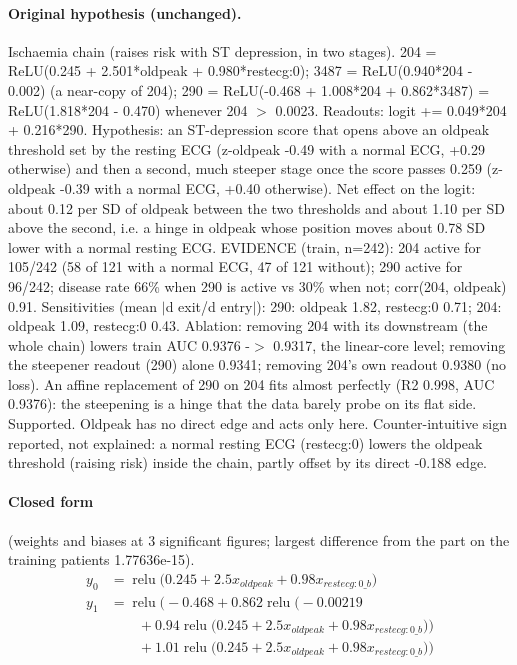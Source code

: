 \documentclass[a4paper,10pt]{article}
\newif\ifreviewmarks
\newcommand{\reviewrule}{\noindent{\color{BrickRed}\rule{\linewidth}{0.8pt}}}
\newenvironment{drafted}[1][]{%
  \ifreviewmarks\par\addvspace{\medskipamount}\reviewrule\par\nopagebreak
  \noindent{\color{BrickRed}\sffamily\footnotesize\textbf{Thesis Draft}\quad #1\hfill review}\par\nopagebreak\smallskip\fi}{%
  \ifreviewmarks\par\smallskip\noindent{\color{BrickRed}\sffamily\footnotesize end of thesis draft}\par\nopagebreak\reviewrule\par\medskip\fi}
\begin{document}
\begin{drafted}[plain-language layer: heart-s5-c3]
\paragraph{Original hypothesis (unchanged).} Ischaemia chain (raises risk with ST depression, in two stages). 204 = ReLU(0.245 + 2.501*oldpeak + 0.980*restecg:0); 3487 = ReLU(0.940*204 - 0.002) (a near-copy of 204); 290 = ReLU(-0.468 + 1.008*204 + 0.862*3487) = ReLU(1.818*204 - 0.470) whenever 204 $>$ 0.0023. Readouts: logit += 0.049*204 + 0.216*290. Hypothesis: an ST-depression score that opens above an oldpeak threshold set by the resting ECG (z-oldpeak -0.49 with a normal ECG, +0.29 otherwise) and then a second, much steeper stage once the score passes 0.259 (z-oldpeak -0.39 with a normal ECG, +0.40 otherwise). Net effect on the logit: about 0.12 per SD of oldpeak between the two thresholds and about 1.10 per SD above the second, i.e. a hinge in oldpeak whose position moves about 0.78 SD lower with a normal resting ECG. EVIDENCE (train, n=242): 204 active for 105/242 (58 of 121 with a normal ECG, 47 of 121 without); 290 active for 96/242; disease rate 66\% when 290 is active vs 30\% when not; corr(204, oldpeak) 0.91. Sensitivities (mean $|$d exit/d entry$|$): 290: oldpeak 1.82, restecg:0 0.71; 204: oldpeak 1.09, restecg:0 0.43. Ablation: removing 204 with its downstream (the whole chain) lowers train AUC 0.9376 -$>$ 0.9317, the linear-core level; removing the steepener readout (290) alone 0.9341; removing 204's own readout 0.9380 (no loss). An affine replacement of 290 on 204 fits almost perfectly (R2 0.998, AUC 0.9376): the steepening is a hinge that the data barely probe on its flat side. Supported. Oldpeak has no direct edge and acts only here. Counter-intuitive sign reported, not explained: a normal resting ECG (restecg:0) lowers the oldpeak threshold (raising risk) inside the chain, partly offset by its direct -0.188 edge.
\paragraph{Closed form} {\footnotesize(weights and biases at 3 significant figures; largest difference from the part on the training patients 1.77636e-15).}
{\small\begingroup\allowdisplaybreaks
\begin{align*}
y_{0} &= \operatorname{relu}\bigl(0.245 + 2.5 x_{oldpeak} + 0.98 x_{restecg:0\_b}\bigr) \\
y_{1} &= \operatorname{relu}\bigl(-0.468 + 0.862 \operatorname{relu}\bigl(-0.00219 \\
&\qquad + 0.94 \operatorname{relu}\bigl(0.245 + 2.5 x_{oldpeak} + 0.98 x_{restecg:0\_b}\bigr)\bigr) \\
&\qquad + 1.01 \operatorname{relu}\bigl(0.245 + 2.5 x_{oldpeak} + 0.98 x_{restecg:0\_b}\bigr)\bigr)
\end{align*}\endgroup}


\end{drafted}
\end{document}
